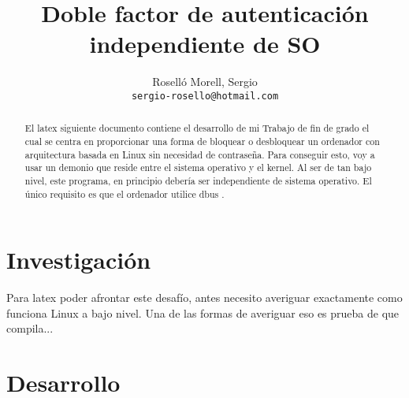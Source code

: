 \documentclass[titlepage]{article}
\title{Doble factor de autenticación independiente de SO}
\author{Roselló Morell, Sergio\\
\texttt{sergio-rosello@hotmail.com}}
\begin{document}
\maketitle
\tableofcontents
\clearpage

\begin{abstract}
El \Gls{latex} siguiente documento contiene el desarrollo de mi Trabajo de fin de grado el cual se centra en proporcionar una forma de bloquear o desbloquear un ordenador con arquitectura basada en Linux sin necesidad de contraseña. Para conseguir esto, voy a usar un demonio que reside entre el sistema operativo y el kernel. Al ser de tan bajo nivel, este programa, en principio debería ser independiente de sistema operativo. El único requisito es que el ordenador utilice dbus \cite{dbus}. 
\end{abstract}
\section{Investigación}
Para \Gls{latex} poder afrontar este desafío, antes necesito averiguar exactamente como funciona Linux a bajo nivel. Una de las formas de averiguar eso es prueba de que compila...
\section{Desarrollo}
\clearpage
\printglossaries
\clearpage
\printbibliography[heading=bibintoc,title={Bibliografía}]
\end{document}
